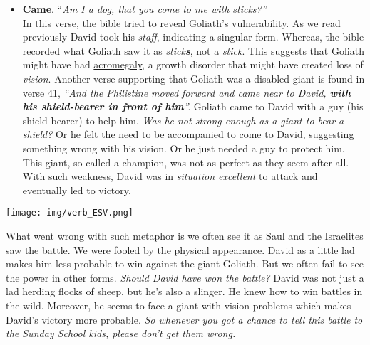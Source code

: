 \documentclass{article}
\begin{document}
\begin{multicols}{2}
\begin{itemize}
      \item \textbf{Came}. {``\small \textit{Am I a dog, that you come to me with sticks?''}}\\
           In this verse, the bible tried to reveal Goliath's vulnerability. 
           As we read previously David took his \textit{staff}, indicating a singular form. 
           Whereas, the bible recorded what Goliath saw it as \textit{stick\textbf{s}}, not a \textit{stick}.
           This suggests that Goliath might have had \href{http://en.wikipedia.org/wiki/Acromegaly}{acromegaly}, a growth disorder that might have created loss of \textit{vision}.
           Another verse supporting that Goliath was a disabled giant is found in verse 41, 
           \textit{``And the Philistine moved forward and came near to David, \textbf{with his shield-bearer in front of him}''.}
           Goliath came to David with a guy (his shield-bearer) to help him. 
           \textit{Was he not strong enough as a giant to bear a shield?} 
           Or he felt the need to be accompanied to come to David, suggesting something wrong with his vision. 
           Or he just needed a guy to protect him.
           This giant, so called a champion, was not as perfect as they seem after all.
           With such weakness, David was in \textit{situation excellent} to attack and eventually led to victory.\\
\end{itemize}



\begingroup
    \centering
    \texttt{[image: img/verb\_ESV.png]}
    \vspace{20pt}
\endgroup

What went wrong with such metaphor is we often see it as Saul and the Israelites saw the battle.
We were fooled by the physical appearance. 
David as a little lad makes him less probable to win against the giant Goliath.
But we often fail to see the power in other forms. 
\textit{Should David have won the battle?}
David was not just a lad herding flocks of sheep, but he's also a slinger.
He knew how to win battles in the wild.
Moreover, he seems to face a giant with vision problems which makes David's victory more probable. 
\textit{So whenever you got a chance to tell this battle to the Sunday School kids, please don't get them wrong.} 


\end{multicols}
\end{document}
